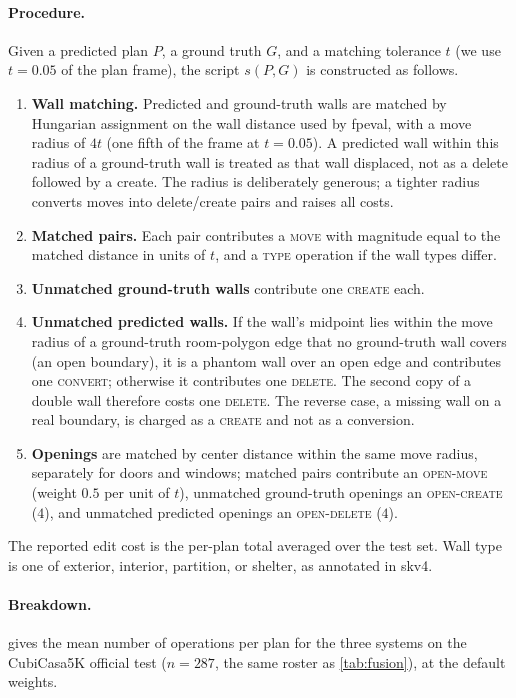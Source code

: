 \documentclass{article}
\begin{document}
\paragraph{Procedure.} Given a predicted plan $P$, a ground truth $G$, and a
matching tolerance $t$ (we use $t=0.05$ of the plan frame), the script
$s(P,G)$ is constructed as follows.
\begin{enumerate}
\item \textbf{Wall matching.} Predicted and ground-truth walls are matched by
  Hungarian assignment on the wall distance used by fpeval, with a move radius
  of $4t$ (one fifth of the frame at $t=0.05$). A predicted wall within this
  radius of a ground-truth wall is treated as that wall displaced, not as a
  delete followed by a create. The radius is deliberately generous; a tighter
  radius converts moves into delete/create pairs and raises all costs.
\item \textbf{Matched pairs.} Each pair contributes a \textsc{move} with
  magnitude equal to the matched distance in units of $t$, and a \textsc{type}
  operation if the wall types differ.
\item \textbf{Unmatched ground-truth walls} contribute one \textsc{create}
  each.
\item \textbf{Unmatched predicted walls.} If the wall's midpoint lies within
  the move radius of a ground-truth room-polygon edge that no ground-truth
  wall covers (an open boundary), it is a phantom wall over an open edge and
  contributes one \textsc{convert}; otherwise it contributes one
  \textsc{delete}. The second copy of a double wall therefore costs one
  \textsc{delete}. The reverse case, a missing wall on a real boundary, is
  charged as a \textsc{create} and not as a conversion.
\item \textbf{Openings} are matched by center distance within the same move
  radius, separately for doors and windows; matched pairs contribute an
  \textsc{open-move} (weight $0.5$ per unit of $t$), unmatched ground-truth
  openings an \textsc{open-create} ($4$), and unmatched predicted openings an
  \textsc{open-delete} ($4$).
\end{enumerate}
The reported edit cost is the per-plan total averaged over the test set. Wall
type is one of exterior, interior, partition, or shelter, as annotated in skv4.

\paragraph{Breakdown.}  gives the mean number of operations
per plan for the three systems on the CubiCasa5K official test ($n{=}287$, the
same roster as \cref{tab:fusion}), at the default weights.
\end{document}
